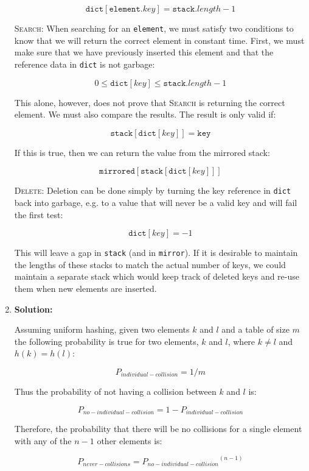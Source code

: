\documentclass{article}
\begin{document}
\begin{enumerate}
    $$ \texttt{dict}[\texttt{element}.key] = \texttt{stack}.length - 1 $$

    \textsc{Search}: When searching for an \texttt{element}, we must satisfy two
    conditions to know that we will return the correct element in constant time.
    First, we must make sure that we have previously inserted this element and
    that the reference data in \texttt{dict} is not garbage:

    $$ 0 \leq \texttt{dict}[key] \leq \texttt{stack}.length -1 $$

    This alone, however, does not prove that \textsc{Search} is returning the
    correct element. We must also compare the results. The result is only valid
    if:

    $$ \texttt{stack}[\texttt{dict}[key]] = \texttt{key} $$

    If this is true, then we can return the value from the mirrored stack:

    $$ \texttt{mirrored}[\texttt{stack}[\texttt{dict}[key]]] $$

    \textsc{Delete}: Deletion can be done simply by turning the key reference in
    \texttt{dict} back into garbage, e.g. to a value that will never be a valid
    key and will fail the first test:

    $$ \texttt{dict}[key] = -1 $$

    This will leave a gap in \texttt{stack} (and in \texttt{mirror}). If it is
    desirable to maintain the lengths of these stacks to match the actual number
    of keys, we could maintain a separate stack which would keep track of
    deleted keys and re-use them when new elements are inserted.

    \item \textbf{Solution:}

    Assuming uniform hashing, given two elements $k$ and $l$ and a table of size
    $m$ the following probability is true for two elements, $k$ and $l$, where
    $k \neq l$ and $h(k) = h(l)$:

    $$ P_{individual-collision} = 1/m $$

    Thus the probability of not having a collision between $k$ and $l$ is:

    $$ P_{no-individual-collision} = 1 - P_{individual-collision} $$

    Therefore, the probability that there will be no collisions for a single
    element with any of the $n-1$ other elements is:

    $$ P_{never-collisions} = {P_{no-individual-collision}}^{(n-1)} $$


\end{enumerate}
\end{document}

